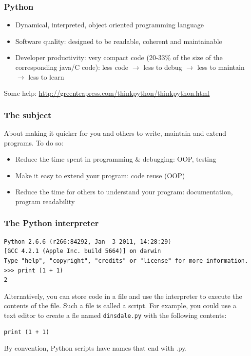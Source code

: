 \documentclass{beamer}
\begin{document}
\begin{frame}
\frametitle{Python}
\begin{itemize}
\item Dynamical, interpreted, object oriented programming language
\item Software quality: designed to be readable, coherent and maintainable
\item Developer productivity: very compact code (20-33\% of the size of the corresponding java/C code): less code $\rightarrow$ less to debug $\rightarrow$ less to maintain $\rightarrow$ less to learn
\end{itemize}
Some help: \url{http://greenteapress.com/thinkpython/thinkpython.html}
\end{frame}

\begin{frame}
\frametitle{The subject}
About making it quicker for you and others to write, maintain and extend programs. To do so:
\begin{itemize}
\item Reduce the time spent in programming \& debugging: OOP, testing
\item Make it easy to extend your program: code reuse (OOP)
\item Reduce the time for others to understand your program: documentation, program readability
\end{itemize}
\end{frame}

\begin{frame}[containsverbatim]
\frametitle{The Python interpreter}
\begin{Verbatim}
Python 2.6.6 (r266:84292, Jan  3 2011, 14:28:29) 
[GCC 4.2.1 (Apple Inc. build 5664)] on darwin
Type "help", "copyright", "credits" or "license" for more information.
>>> print (1 + 1) 
2 
\end{Verbatim}
Alternatively, you can store code in a file and use the interpreter to execute the contents of the file. Such a file is called a script. For example, you could use a text editor to create a fle named \texttt{dinsdale.py} with the following contents: 
\begin{lstlisting}
print (1 + 1) 
\end{lstlisting}
By convention, Python scripts have names that end with .py. 
\end{frame}
\end{document}
